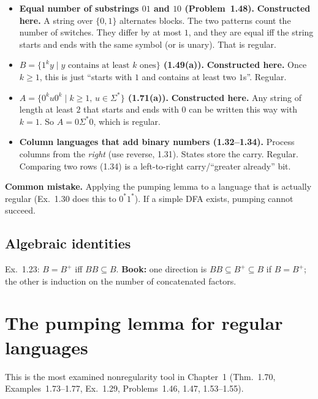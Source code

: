 \documentclass[11pt,a4paper]{article}
\begin{document}
\begin{itemize}
  \item \textbf{Equal number of substrings $01$ and $10$
        (Problem~1.48).} \textbf{Constructed here.} A string over
        $\{0,1\}$ alternates blocks. The two patterns count the
        number of switches. They differ by at most $1$, and they are
        equal iff the string starts and ends with the same symbol
        (or is unary). That is regular.
  \item \textbf{$B=\{1^ky\mid y\text{ contains at least }k\text{ ones}\}$
        (1.49(a)).} \textbf{Constructed here.} Once $k\ge 1$, this is
        just ``starts with $1$ and contains at least two $1$s''.
        Regular.
  \item \textbf{$A=\{0^ku0^k\mid k\ge 1,\,u\in\Sigma^*\}$ (1.71(a)).}
        \textbf{Constructed here.} Any string of length at least $2$
        that starts and ends with $0$ can be written this way with
        $k=1$. So $A=0\Sigma^*0$, which is regular.
  \item \textbf{Column languages that add binary numbers
        (1.32--1.34).} Process columns from the \emph{right} (use
        reverse, 1.31). States store the carry. Regular. Comparing
        two rows (1.34) is a left-to-right carry/``greater already''
        bit.
\end{itemize}

\textbf{Common mistake.}
Applying the pumping lemma to a language that is actually regular
(Ex.~1.30 does this to $0^*1^*$). If a simple DFA exists, pumping
cannot succeed.

\subsection{Algebraic identities}

Ex.~1.23: $B=B^+$ iff $BB\subseteq B$. \textbf{Book:} one direction
is $BB\subseteq B^+\subseteq B$ if $B=B^+$; the other is induction
on the number of concatenated factors.

\section{The pumping lemma for regular languages}
\label{type:pump-reg}

This is the most examined nonregularity tool in Chapter~1
(Thm.~1.70, Examples~1.73--1.77, Ex.~1.29, Problems~1.46, 1.47,
1.53--1.55).
\end{document}
